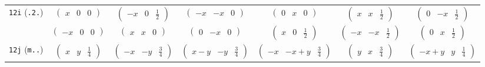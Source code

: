 \documentclass[fleqn,9pt,landscape]{jsarticle}
\begin{document}
\begin{center}
\begin{longtable}{ccccccc}
{\tt 12i} ({\tt .2.}) & $ \begin{pmatrix} x & 0 & 0 \end{pmatrix} $ & $ \begin{pmatrix} - x & 0 & \frac{1}{2} \end{pmatrix} $ & $ \begin{pmatrix} - x & - x & 0 \end{pmatrix} $ & $ \begin{pmatrix} 0 & x & 0 \end{pmatrix} $ & $ \begin{pmatrix} x & x & \frac{1}{2} \end{pmatrix} $ & $ \begin{pmatrix} 0 & - x & \frac{1}{2} \end{pmatrix} $ \\
& $ \begin{pmatrix} - x & 0 & 0 \end{pmatrix} $ & $ \begin{pmatrix} x & x & 0 \end{pmatrix} $ & $ \begin{pmatrix} 0 & - x & 0 \end{pmatrix} $ & $ \begin{pmatrix} x & 0 & \frac{1}{2} \end{pmatrix} $ & $ \begin{pmatrix} - x & - x & \frac{1}{2} \end{pmatrix} $ & $ \begin{pmatrix} 0 & x & \frac{1}{2} \end{pmatrix} $ \\ \hline
{\tt 12j} ({\tt m..}) & $ \begin{pmatrix} x & y & \frac{1}{4} \end{pmatrix} $ & $ \begin{pmatrix} - x & - y & \frac{3}{4} \end{pmatrix} $ & $ \begin{pmatrix} x - y & - y & \frac{3}{4} \end{pmatrix} $ & $ \begin{pmatrix} - x & - x + y & \frac{3}{4} \end{pmatrix} $ & $ \begin{pmatrix} y & x & \frac{3}{4} \end{pmatrix} $ & $ \begin{pmatrix} - x + y & y & \frac{1}{4} \end{pmatrix} $ \\

\end{longtable}
\end{center}
\end{document}
